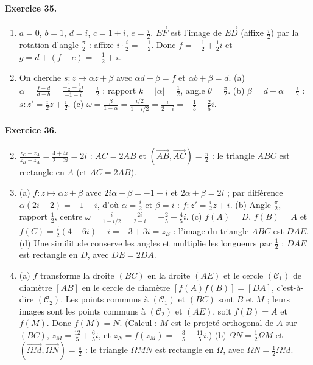 \begin{corrige}
\paragraph{Exercice 35.}
\begin{enumerate}
\item $a = 0$, $b = 1$, $d = i$, $c = 1 + i$, $e = \frac{i}{2}$.
      $\overrightarrow{EF}$ est l'image de $\overrightarrow{ED}$ (affixe $\frac{i}{2}$) par la rotation d'angle $\frac{\pi}{2}$ : affixe $i\cdot\frac{i}{2} = -\frac{1}{2}$.
      Donc $f = -\frac{1}{2} + \frac{1}{2}i$ et $g = d + (f - e) = -\frac{1}{2} + i$.
\item On cherche $s : z \mapsto \alpha z + \beta$ avec $\alpha d + \beta = f$ et $\alpha b + \beta = d$.
      (a) $\alpha = \frac{f - d}{d - b} = \frac{-\frac{1}{2} - \frac{1}{2}i}{-1 + i} = \frac{i}{2}$ : rapport $k = |\alpha| = \frac{1}{2}$, angle $\theta = \frac{\pi}{2}$.
      (b) $\beta = d - \alpha = \frac{i}{2}$ : $s : z' = \frac{i}{2}z + \frac{i}{2}$.
      (c) $\omega = \frac{\beta}{1 - \alpha} = \frac{i/2}{1 - i/2} = \frac{i}{2 - i} = \boxed{-\frac{1}{5} + \frac{2}{5}i}$.
\end{enumerate}

\paragraph{Exercice 36.}
\begin{enumerate}
\setcounter{enumi}{1}
\item $\frac{z_C - z_A}{z_B - z_A} = \frac{4 + 4i}{2 - 2i} = 2i$ : $AC = 2AB$ et $\left(\overrightarrow{AB},\overrightarrow{AC}\right) = \frac{\pi}{2}$ :
      le triangle $ABC$ est rectangle en $A$ (et $AC = 2AB$).
\item (a) $f : z \mapsto \alpha z + \beta$ avec $2i\alpha + \beta = -1 + i$ et $2\alpha + \beta = 2i$ ; par diff\'erence $\alpha(2i - 2) = -1 - i$,
      d'o\`u $\alpha = \frac{i}{2}$ et $\beta = i$ : $f : z' = \frac{i}{2}z + i$.
      (b) Angle $\frac{\pi}{2}$, rapport $\frac{1}{2}$, centre $\omega = \frac{i}{1 - i/2} = \frac{2i}{2 - i} = -\frac{2}{5} + \frac{4}{5}i$.
      (c) $f(A) = D$, $f(B) = A$ et $f(C) = \frac{i}{2}(4 + 6i) + i = -3 + 3i = z_E$ : l'image du triangle $ABC$ est $DAE$.
      (d) Une similitude conserve les angles et multiplie les longueurs par $\frac{1}{2}$ : $DAE$ est rectangle en $D$, avec $DE = 2DA$.
\item (a) $f$ transforme la droite $(BC)$ en la droite $(AE)$ et le cercle $(\mathscr{C}_1)$ de diam\`etre $[AB]$ en le cercle de diam\`etre $[f(A)f(B)] = [DA]$, c'est-\`a-dire $(\mathscr{C}_2)$.
      Les points communs \`a $(\mathscr{C}_1)$ et $(BC)$ sont $B$ et $M$ ; leurs images sont les points communs \`a $(\mathscr{C}_2)$ et $(AE)$, soit $f(B) = A$ et $f(M)$.
      Donc $f(M) = N$. (Calcul : $M$ est le projet\'e orthogonal de $A$ sur $(BC)$, $z_M = \frac{12}{5} + \frac{6}{5}i$, et $z_N = f(z_M) = -\frac{3}{5} + \frac{11}{5}i$.)
      (b) $\Omega N = \frac{1}{2}\Omega M$ et $\left(\overrightarrow{\Omega M},\overrightarrow{\Omega N}\right) = \frac{\pi}{2}$ : le triangle $\Omega MN$ est rectangle en $\Omega$, avec $\Omega N = \frac{1}{2}\Omega M$.
\end{enumerate}


\end{corrige}
